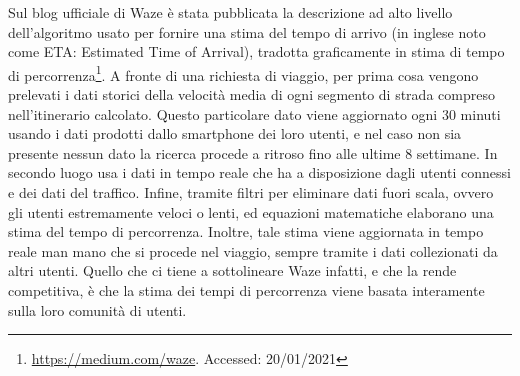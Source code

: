 Sul blog ufficiale di Waze è stata pubblicata la descrizione ad alto livello dell'algoritmo usato per fornire una stima del tempo di arrivo (in inglese noto come ETA: Estimated Time of Arrival), tradotta graficamente in stima di tempo di percorrenza\footnote{\url{https://medium.com/waze}. Accessed: 20/01/2021}. A fronte di una richiesta di viaggio, per prima cosa vengono prelevati i dati storici della velocità media di ogni segmento di strada compreso nell'itinerario calcolato. Questo particolare dato viene aggiornato ogni 30 minuti usando i dati prodotti dallo smartphone dei loro utenti, e nel caso non sia presente nessun dato la ricerca procede a ritroso fino alle ultime 8 settimane. In secondo luogo usa i dati in tempo reale che ha a disposizione dagli utenti connessi e dei dati del traffico. Infine, tramite filtri per eliminare dati fuori scala, ovvero gli utenti estremamente veloci o lenti, ed equazioni matematiche elaborano una stima del tempo di percorrenza. Inoltre, tale stima viene aggiornata in tempo reale man mano che si procede nel viaggio, sempre tramite i dati collezionati da altri utenti. Quello che ci tiene a sottolineare Waze infatti, e che la rende competitiva, è che la stima dei tempi di percorrenza viene basata interamente sulla loro comunità di utenti.

























